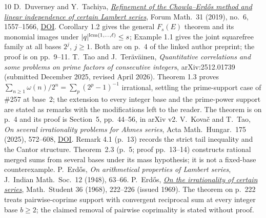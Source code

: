 \documentclass[11pt]{article}
\begin{document}
\begin{thebibliography}{10}
 D.~Duverney and Y.~Tachiya,
  \href{https://danielduverney.fr/documents/theorie-des-nombres/DuverneyTachiya190522.pdf}
  {\emph{Refinement of the Chowla--Erd\H{o}s method and linear independence
  of certain Lambert series}},
  Forum Math.\ 31 (2019), no.~6, 1557--1566,
  \href{https://doi.org/10.1515/forum-2018-0299}{DOI}.  Corollary 1.2 gives
  the general $F_s(E)$ theorem and its monomial images under
  $|q|^{\operatorname{lcm}(1,\dots,\ell)}\le s$; Example 1.1 gives the joint squarefree
  family at all bases \(2^j\), \(j\ge1\).  Both are on p.~4 of the linked
  author preprint; the proof is on pp.~9--11.
 T.~Tao and J.~Ter\"av\"ainen,
  \emph{Quantitative correlations and some problems on prime factors of
  consecutive integers}, arXiv:2512.01739 (submitted December 2025, revised
  April 2026).  Theorem 1.3 proves $\sum_{n\ge1}\omega(n)/2^n=\sum_p(2^p-1)^{-1}$
  irrational, settling the prime-support case of \#257 at base~$2$; the
  extension to every integer base and the prime-power support are stated as
  remarks with the modifications left to the reader.  The theorem is on
  p.~4 and its proof is Section~5, pp.~44--56, in arXiv v2.
 V.~Kova\v{c} and T.~Tao, \emph{On several irrationality
  problems for Ahmes series}, Acta Math.\ Hungar.\ 175 (2025), 572--608,
  \href{https://doi.org/10.1007/s10474-025-01528-0}{DOI}.  Remark 4.1
  (p.~13) records the strict tail inequality and the Cantor structure.
  Theorem~2.3 (p.~5; proof pp.~13--14) constructs rational merged sums from
  several bases under its mass hypothesis; it is not a fixed-base
  counterexample.
 P.~Erd\H{o}s, \emph{On arithmetical properties of Lambert
  series}, J.~Indian Math.\ Soc.\ 12 (1948), 63--66.
 P.~Erd\H{o}s,
  \href{https://users.renyi.hu/~p_erdos/1969-09.pdf}{\emph{On the
  irrationality of certain series}}, Math.\ Student 36 (1968), 222--226
  (issued 1969).  The theorem on p.~222 treats pairwise-coprime support with
  convergent reciprocal sum at every integer base $b\ge2$; the claimed
  removal of pairwise coprimality is stated without proof.
\end{thebibliography}
\end{document}
